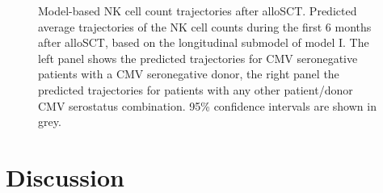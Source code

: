\documentclass[
  letterpaper,
  DIV=11,
  numbers=noendperiod]{scrreprt}
\begin{document}
\begin{figure}


\caption{\label{fig-DLI-seven}Model-based NK cell count trajectories
after alloSCT. Predicted average trajectories of the NK cell counts
during the first 6 months after alloSCT, based on the longitudinal
submodel of model I. The left panel shows the predicted trajectories for
CMV seronegative patients with a CMV seronegative donor, the right panel
the predicted trajectories for patients with any other patient/donor CMV
serostatus combination. 95\% confidence intervals are shown in grey.}

\end{figure}%

\section{Discussion}\label{discussion-1}
\end{document}
